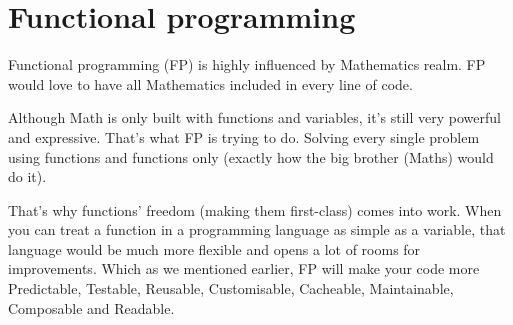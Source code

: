  

 
 
 
 
 
 
    \section{Functional programming} \label{sec:fpro}
 
Functional programming (FP) is highly influenced by Mathematics realm. 
FP would love to have all Mathematics included in every line of code.
 
Although Math is only built with functions and variables, it’s still very powerful and expressive. 
That’s what FP is trying to do. 
Solving every single problem using functions and functions only (exactly how the big brother (Maths) would do it).
 
That’s why functions’ freedom (making them first-class) comes into work. 
When you can treat a function in a programming language as simple as a variable, that language would be much more flexible and opens a lot of rooms for improvements. 
Which as we mentioned earlier, FP will make your code more Predictable, Testable, Reusable, Customisable, Cacheable, Maintainable, Composable and Readable.
 
 
 
 
 
 
 
 
 
% 
% 
